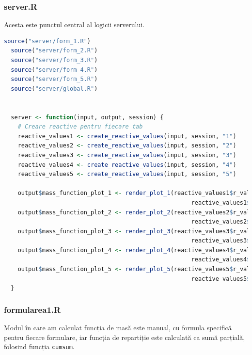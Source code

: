 \documentclass[a4paper,11pt]{article}
\begin{document}
\subsubsection*{server.R}

Acesta este punctul central al logicii serverului.

\begin{lstlisting}[language=R]
  source("server/form_1.R")
  source("server/form_2.R")
  source("server/form_3.R")
  source("server/form_4.R")
  source("server/form_5.R")
  source("server/global.R")
  
  
  server <- function(input, output, session) {
    # Creare reactive pentru fiecare tab
    reactive_values1 <- create_reactive_values(input, session, "1")
    reactive_values2 <- create_reactive_values(input, session, "2")
    reactive_values3 <- create_reactive_values(input, session, "3")
    reactive_values4 <- create_reactive_values(input, session, "4")
    reactive_values5 <- create_reactive_values(input, session, "5")
    
    output$mass_function_plot_1 <- render_plot_1(reactive_values1$r_value, 
                                                      reactive_values1$p_value)
    output$mass_function_plot_2 <- render_plot_2(reactive_values2$r_value, 
                                                      reactive_values2$p_value)
    output$mass_function_plot_3 <- render_plot_3(reactive_values3$r_value, 
                                                      reactive_values3$p_value)
    output$mass_function_plot_4 <- render_plot_4(reactive_values4$r_value, 
                                                      reactive_values4$p_value)
    output$mass_function_plot_5 <- render_plot_5(reactive_values5$r_value, 
                                                      reactive_values5$p_value)
  }
\end{lstlisting}

\subsubsection*{formularea1.R}

Modul în care am calculat funcția de masă este manual, cu formula specifică pentru fiecare formulare, iar funcția de repartiție este calculată ca sumă parțială, folosind funcția \texttt{cumsum}.
\end{document}
